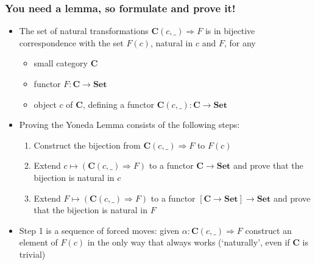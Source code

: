 \documentclass[handout]{beamer}
\newcommand{\To}{\Rightarrow}
\newcommand{\bfsf}[1]{{\boldsymbol{#1}}}
\newcommand{\Set}{\bfsf{Set}}
\newcommand{\CC}{\bfsf{C}}
\begin{document}
\frame
  {   
    \frametitle{You need a lemma, so formulate and prove it!}\label{Yon:Intro}

 \begin{itemize}[<+->]
\item The set of natural transformations $\CC(c,\_)\To F$ is in bijective
correspondence with the set $F(c)$, natural in $c$ and $F$, for any
\begin{itemize}
    \item small category $\CC$
    \item functor $F:\CC\to\Set$
    \item object $c$ of $\CC$, defining a functor $\CC(c,\_):\CC\to\Set$
 \end{itemize}
\item Proving the Yoneda Lemma consists of the following steps:
 \begin{enumerate}
    \item Construct the bijection from $\CC(c,\_)\To F$ to $F(c)$
    \item Extend $c\mapsto(\CC(c,\_)\To F)$ to a functor $\CC\to\Set$ and
prove that the bijection is natural in $c$
    \item Extend $F\mapsto(\CC(c,\_)\To F)$ to a functor $[\CC\to\Set]\to\Set$ and
prove that the bijection is natural in $F$
   \end{enumerate}
\item Step 1 is a sequence of forced moves: given $\alpha: \CC(c,\_)\To F$
construct an element of  $F(c)$ in the only way that always works (`naturally',
even if $\CC$ is trivial)
 \end{itemize}

 }
\end{document}
